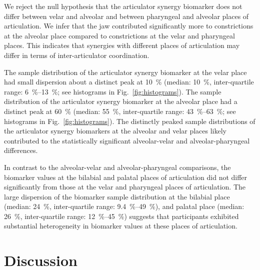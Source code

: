 \documentclass[preprint]{JASAnew}\usepackage[]{graphicx}\usepackage[]{color}
\begin{document}
We reject the null hypothesis that the articulator synergy biomarker does not differ between velar and alveolar and between pharyngeal and alveolar places of articulation. 
%
We infer that the jaw contributed significantly more to constrictions at the alveolar place compared to constrictions at the velar and pharyngeal places.
%
This indicates that synergies with different places of articulation may differ in terms of inter-articulator coordination.




The sample distribution of the articulator synergy biomarker at the velar place had small dispersion about a distinct peak at \SI{10}{\percent} 
%
(median: \SI{10}{\percent}, 
inter-quartile range: \SIrange{6}{13}{\percent}; see histograms in Fig.~\ref{fig:histograms}).
%
The sample distribution of the articulator synergy biomarker at the alveolar place had a distinct peak at \SI{60}{\percent}
%
(median: \SI{55}{\percent}, 
inter-quartile range: \SIrange{43}{63}{\percent}; see histograms in Fig.~\ref{fig:histograms}).
%
The distinctly peaked sample distributions of the articulator synergy biomarkers at the alveolar and velar places likely contributed to the statistically significant alveolar-velar and alveolar-pharyngeal differences.



In contrast to the alveolar-velar and alveolar-pharyngeal comparisons, the biomarker values at the bilabial and palatal places of articulation did not differ significantly from those at the velar and pharyngeal places of articulation. 
%
The large dispersion of the biomarker sample distribution at the bilabial place
%
(median: \SI{24}{\percent}, 
inter-quartile range: \SIrange{9.4}{49}{\percent}), 
%
and palatal place
%
(median: \SI{26}{\percent}, 
inter-quartile range: \SIrange{12}{45}{\percent})
%
suggests that participants exhibited substantial heterogeneity in biomarker values at these places of articulation.  










\section{Discussion}
\end{document}
